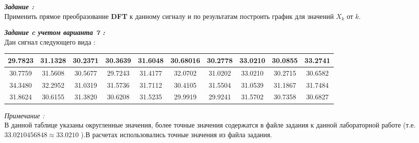 \documentclass[a4paper,11pt]{article}
\begin{document}
		\begin{flushleft}
		\textit{\textbf{Задание :}}
		\\
		\medskip
		\hangindent=1.5cm  \noindent
		Применить прямое преобразование \textbf{DFT} к данному сигналу и по результатам построить график для значений ${X_k}$ от ${k}$.
		\end{flushleft}
		\begin{flushleft}
		\textit{\textbf{Задание c учетом варианта 7 :}}
		\\
		\medskip
		\hangindent=1.5cm  \noindent
		Дан сигнал следующего вида :		
	\end{flushleft}
			\begin{center}
					\begin{tabular}{|c|c|c|c|c|c|c|c|c|c|}
\hline 29.7823 & 31.1328 & 30.2371 & 30.3639 & 31.6048 & 30.68016 & 30.2778 & 33.0210 & 30.0855 & 33.2741 \\ 
\hline 30.7759 & 31.5608 & 30.5677 & 29.7243 & 31.4177 & 32.0702 & 31.0202 & 33.0210 & 30.2715 & 30.6582 \\ 
\hline 34.3480 & 32.2952 & 31.0319 & 31.5736 & 31.7112 & 30.4105 & 31.5504 & 31.0539 & 31.1867 & 31.7484 \\ 
\hline 31.8624 & 30.6155 & 31.3820 & 30.6208 & 31.5235 & 29.9919 & 29.9241 & 31.5702 & 30.7358 & 30.6827 \\ 
\hline 
\end{tabular}
		\end{center}
		\begin{flushleft}
		\medskip
		\hangindent=1.5cm  \noindent
		\textit{Примечание :}
		\\
		\medskip В данной таблице указаны округленные значения, более точные значения содержатся в файле задания к данной лабораторной работе (т.е. ${33.0210456848 \approx 33.0210}$ ).В расчетах использовались точные значения из файла задания. 	
		\end{flushleft}
\end{document}
